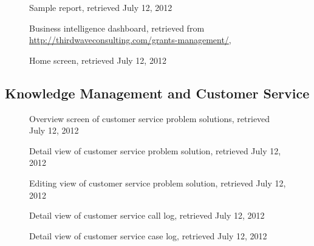 \begin{figure}[htbp]
	\centering
	\caption[SugarCRM: Sample report]{Sample report, retrieved July 12, 2012}
\end{figure}

\begin{figure}[htbp]
	\centering
	\caption[SugarCRM: Business intelligence dashboard]{Business intelligence dashboard, retrieved from \url{http://thirdwaveconsulting.com/grants-management/}, \downloadDate}
\end{figure}

\begin{figure}[htbp]
	\centering
	\caption[SugarCRM: Home screen]{Home screen, retrieved July 12, 2012}
\end{figure}

\FloatBarrier
\subsection{Knowledge Management and Customer Service}
\begin{figure}[htbp]
	\centering
	\caption[SugarCRM: Overview screen of customer service problem solutions]{Overview screen of customer service problem solutions, retrieved July 12, 2012}
\end{figure}

\begin{figure}[htbp]
	\centering
	\caption[SugarCRM: Detail view of customer service problem solution]{Detail view of customer service problem solution, retrieved July 12, 2012}
\end{figure}

\begin{figure}[htbp]
	\centering
	\caption[SugarCRM: Editing view of customer service problem solution]{Editing view of customer service problem solution, retrieved July 12, 2012}
\end{figure}

\begin{figure}[htbp]
	\centering
	\caption[SugarCRM: Detail view of customer service call log]{Detail view of customer service call log, retrieved July 12, 2012}
\end{figure}

\begin{figure}[htbp]
	\centering
	\caption[SugarCRM: Detail view of customer service case log]{Detail view of customer service case log, retrieved July 12, 2012}
\end{figure}